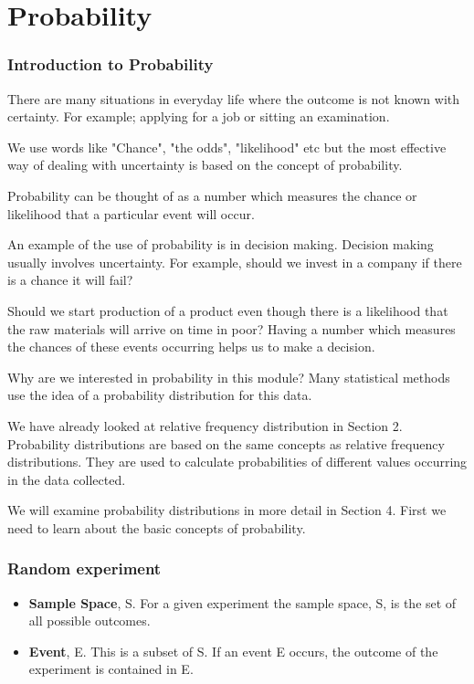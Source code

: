 \documentclass[IntroMain.tex]{subfiles}
\begin{document}
	\section{Probability}
\begin{frame}
	
	
	\frametitle{Introduction to Probability}
	
	There are many situations in everyday life where the outcome is not known with certainty. For example; applying for a job or sitting an examination.
	
	We use words like "Chance", "the odds", "likelihood" etc but the most effective way of dealing with uncertainty is based on the concept of probability.
	
	Probability can be thought of as a number which measures the chance or likelihood that a particular event will occur.
	
\end{frame}
\begin{frame}
	An example of the use of probability is in decision making. Decision making usually involves uncertainty. For example, should we invest in a company if there is a chance it will fail? 
	
	Should we start production of a product even though there is a likelihood that the raw materials will arrive on time in poor? Having a number which measures the chances of these events occurring helps us to make a decision.
	
\end{frame}
\begin{frame}
	
	Why are we interested in probability in this module? Many statistical methods use the idea of a probability distribution for this data.
	
	We have already looked at relative frequency distribution in Section 2. Probability distributions are based on the same concepts as relative frequency distributions. They are used to calculate probabilities of different values occurring in the data collected.
	
	We will examine probability distributions in more detail in Section 4. First we need to learn about the basic concepts of probability.
\end{frame}
\begin{frame}
	
	\frametitle{Random experiment}
	\begin{itemize}
		\item \textbf{Sample Space}, S. For a given experiment the sample space, S, is the set of all
		possible outcomes.
		\item \textbf{Event}, E. This is a subset of S. If an event E occurs, the outcome of the experiment is contained in E.
	\end{itemize}
	
\end{frame}
\end{document}
